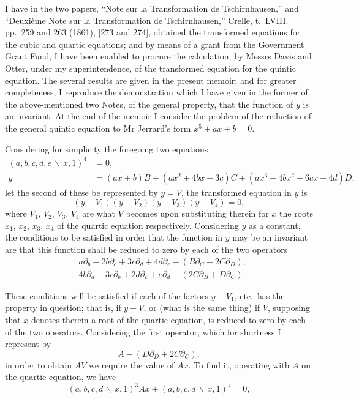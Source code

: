 \documentclass[11pt,a4paper]{article}
\theoremstyle{definition}
\begin{document}
I have in the two papers, ``Note sur la Transformation de Tschirnhausen,'' and
``Deuxi\`{e}me Note sur la Transformation de Tschirnhausen,'' Crelle, t.~LVIII. pp.~259
and 263 (1861), [273 and 274], obtained the transformed equations for the cubic and
quartic equations; and by means of a grant from the Government Grant Fund, I have been
enabled to procure the calculation, by Messrs Davis and Otter, under my superintendence,
of the transformed equation for the quintic equation. The several results are given in
the present memoir; and for greater completeness, I reproduce the demonstration which I
have given in the former of the above-mentioned two Notes, of the general property, that
the function of $y$ is an invariant. At the end of the memoir I consider the problem of
the reduction of the general quintic equation to Mr Jerrard's form $x^{5}+ax+b=0$.

Considering for simplicity the foregoing two equations
\begin{align*}
(a,b,c,d,e\,\backslash\!\!\,x,1)^{4} &= 0,\\
y &= (ax+b)B + (ax^{2}+4bx+3c)C + (ax^{3}+4bx^{2}+6cx+4d)D;
\end{align*}
let the second of these be represented by $y = V$, the transformed equation in $y$ is
\[(y-V_{1})(y-V_{2})(y-V_{3})(y-V_{4}) = 0,\]
where $V_{1}$, $V_{2}$, $V_{3}$, $V_{4}$ are what $V$ becomes upon substituting therein
for $x$ the roots $x_{1}$, $x_{2}$, $x_{3}$, $x_{4}$ of the quartic equation respectively.
Considering $y$ as a constant, the conditions to be satisfied in order that the function
in $y$ may be an invariant are that this function shall be reduced to zero by each of
the two operators
\begin{align*}
&a\partial_{b} + 2b\partial_{c} + 3c\partial_{d} + 4d\partial_{e} - (B\partial_{C} + 2C\partial_{D}),\\
&4b\partial_{a} + 3c\partial_{b} + 2d\partial_{c} + e\partial_{d} - (2C\partial_{B} + D\partial_{C}).
\end{align*}

These conditions will be satisfied if each of the factors $y-V_{1}$, etc.\ has the
property in question; that is, if $y-V$, or (what is the same thing) if $V$, supposing
that $x$ denotes therein a root of the quartic equation, is reduced to zero by each of
the two operators. Considering the first operator, which for shortness I represent by
\[A - (D\partial_{D} + 2C\partial_{C}),\]
in order to obtain $AV$ we require the value of $Ax$. To find it, operating with $A$ on
the quartic equation, we have
\[(a,b,c,d\,\backslash\!\!\,x,1)^{3}Ax + (a,b,c,d\,\backslash\!\!\,x,1)^{4} = 0,\]
\end{document}
